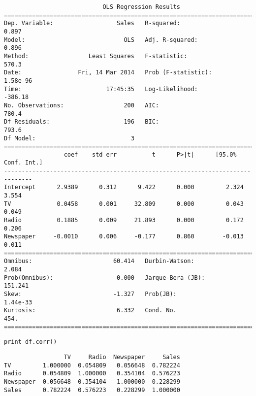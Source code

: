 \documentclass[12pt,fleqn]{article}\usepackage{../common}
\begin{document}
\begin{verbatim}
                            OLS Regression Results                            
==============================================================================
Dep. Variable:                  Sales   R-squared:                       0.897
Model:                            OLS   Adj. R-squared:                  0.896
Method:                 Least Squares   F-statistic:                     570.3
Date:                Fri, 14 Mar 2014   Prob (F-statistic):           1.58e-96
Time:                        17:45:35   Log-Likelihood:                -386.18
No. Observations:                 200   AIC:                             780.4
Df Residuals:                     196   BIC:                             793.6
Df Model:                           3                                         
==============================================================================
                 coef    std err          t      P>|t|      [95.0% Conf. Int.]
------------------------------------------------------------------------------
Intercept      2.9389      0.312      9.422      0.000         2.324     3.554
TV             0.0458      0.001     32.809      0.000         0.043     0.049
Radio          0.1885      0.009     21.893      0.000         0.172     0.206
Newspaper     -0.0010      0.006     -0.177      0.860        -0.013     0.011
==============================================================================
Omnibus:                       60.414   Durbin-Watson:                   2.084
Prob(Omnibus):                  0.000   Jarque-Bera (JB):              151.241
Skew:                          -1.327   Prob(JB):                     1.44e-33
Kurtosis:                       6.332   Cond. No.                         454.
==============================================================================
\end{verbatim}


\begin{verbatim}
print df.corr()
\end{verbatim}

\begin{verbatim}
                 TV     Radio  Newspaper     Sales
TV         1.000000  0.054809   0.056648  0.782224
Radio      0.054809  1.000000   0.354104  0.576223
Newspaper  0.056648  0.354104   1.000000  0.228299
Sales      0.782224  0.576223   0.228299  1.000000
\end{verbatim}
\end{document}
